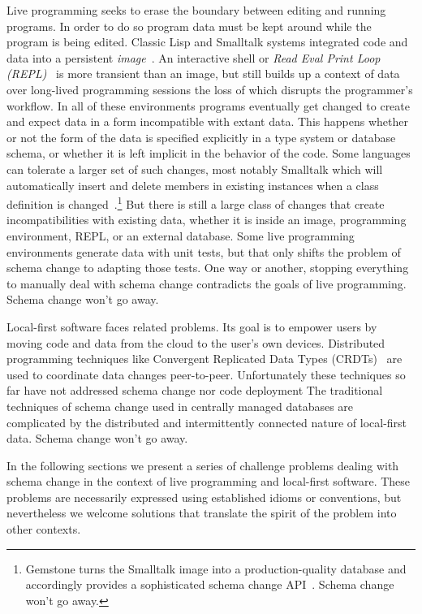 \documentclass[english,submission]{programming}
\begin{document}
Live programming seeks to erase the boundary between editing and running programs. In order to do so program data must be kept around while the program is being edited. Classic Lisp and Smalltalk systems integrated code and data into a persistent \textit{image}~\cite{Sandewall78, Goldberg80}. An interactive shell or \textit{Read Eval Print Loop (REPL)}~\cite{Deutsch64} is more transient than an image, but still builds up a context of data over long-lived programming sessions the loss of which disrupts the programmer's workflow. In all of these environments programs eventually get changed to create and expect data in a form incompatible with extant data. This happens whether or not the form of the data is specified explicitly in a type system or database schema, or whether it is left implicit in the behavior of the code. Some languages can tolerate a larger set of such changes, most notably Smalltalk which will automatically insert and delete members in existing instances when a class definition is changed~\cite[pp.252-272]{Goldberg80}.\footnote{Gemstone turns the Smalltalk image into a production-quality database and accordingly provides a sophisticated schema change API~\cite{Gemstone}. Schema change won't go away.} But there is still a large class of changes that create incompatibilities with existing data, whether it is inside an image, programming environment, REPL, or an external database. Some live programming environments generate data with unit tests, but that only shifts the problem of schema change to adapting those tests. One way or another, stopping everything to manually deal with schema change contradicts the goals of live programming. Schema change won't go away.

Local-first software faces related problems. Its goal is to empower users by moving code and data from the cloud to the user's own devices. Distributed programming techniques like Convergent Replicated Data Types (CRDTs)~\cite{Shapiro11} are used to coordinate data changes peer-to-peer. Unfortunately these techniques so far have not addressed schema change nor code deployment The traditional techniques of schema change used in centrally managed databases are complicated by the distributed and intermittently connected nature of local-first data. Schema change won't go away.

In the following sections we present a series of challenge problems dealing with schema change in the context of live programming and local-first software. These problems are necessarily expressed using established idioms or conventions, but nevertheless we welcome solutions that translate the spirit of the problem into other contexts.
\end{document}
